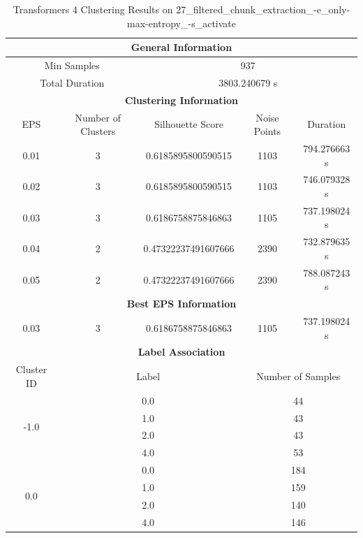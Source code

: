 \begin{longtable}{|c|c|c|c|c|}
\caption{Transformers 4 Clustering Results on 27\_filtered\_chunk\_extraction\_-e\_only-max-entropy\_-s\_activate} \label{tab:27_filtered_chunk_extraction_-e_only-max-entropy_-s_activate_transformers_4_clustering_results}\\
\hline
\multicolumn{5}{|c|}{\textbf{General Information}} \\
\hline
\multicolumn{2}{|c|}{Min Samples} & \multicolumn{3}{c|}{937} \\
\multicolumn{2}{|c|}{Total Duration} & \multicolumn{3}{c|}{3803.240679 s} \\
\hline
\multicolumn{5}{|c|}{\textbf{Clustering Information}} \\
\hline
EPS & Number of Clusters & Silhouette Score & Noise Points & Duration \\
0.01 & 3 & 0.6185895800590515 & 1103 & 794.276663 s\\
0.02 & 3 & 0.6185895800590515 & 1103 & 746.079328 s\\
0.03 & 3 & 0.6186758875846863 & 1105 & 737.198024 s\\
0.04 & 2 & 0.47322237491607666 & 2390 & 732.879635 s\\
0.05 & 2 & 0.47322237491607666 & 2390 & 788.087243 s\\
\hline
\multicolumn{5}{|c|}{\textbf{Best EPS Information}} \\
\hline
0.03 & 3 & 0.6186758875846863 & 1105 & 737.198024 s\\
\hline
\multicolumn{5}{|c|}{\textbf{Label Association}} \\
\hline
Cluster ID & \multicolumn{2}{c|}{Label} & \multicolumn{2}{c|}{Number of Samples} \\
\hline
\multirow{4}{*}{-1.0} & \multicolumn{2}{c|}{0.0} & \multicolumn{2}{c|}{44} \\
& \multicolumn{2}{c|}{1.0} & \multicolumn{2}{c|}{43} \\
& \multicolumn{2}{c|}{2.0} & \multicolumn{2}{c|}{43} \\
& \multicolumn{2}{c|}{4.0} & \multicolumn{2}{c|}{53} \\
\hline
\multirow{4}{*}{0.0} & \multicolumn{2}{c|}{0.0} & \multicolumn{2}{c|}{184} \\
& \multicolumn{2}{c|}{1.0} & \multicolumn{2}{c|}{159} \\
& \multicolumn{2}{c|}{2.0} & \multicolumn{2}{c|}{140} \\
& \multicolumn{2}{c|}{4.0} & \multicolumn{2}{c|}{146} \\

\end{longtable}
